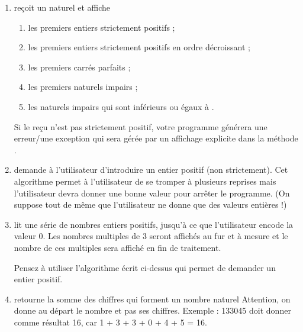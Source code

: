\documentclass[11pt,a4paper]{article}
\begin{document}
					\begin{enumerate}
				
			\item re\c coit un naturel \verb@n@ et affiche
              
					\begin{enumerate}
				
			\item les \verb@n@ premiers entiers strictement positifs ;
			\item les \verb@n@ premiers entiers strictement positifs en ordre d\'ecroissant ;
			\item les \verb@n@ premiers carr\'es parfaits ;
			\item les \verb@n@ premiers naturels impairs ;
			\item les naturels impairs qui sont inf\'erieurs ou \'egaux \`a \verb@n@.
					\end{enumerate}
				
              Si le \verb@n@ re\c cu n'est pas strictement positif, votre programme g\'en\'erera une erreur/une exception 
              qui sera g\'er\'ee par un affichage explicite dans la m\'ethode \verb@main@.
            
			\item 
              demande \`a l'utilisateur d'introduire un entier positif (non strictement). 
              Cet algorithme permet \`a l'utilisateur de se tromper \`a plusieurs reprises mais l'utilisateur devra donner
              une bonne valeur pour arr\^eter le programme.
              (On suppose tout de m\^eme que l'utilisateur ne donne que des valeurs enti\`eres !) 
            
			\item 
              lit une s\'erie de nombres entiers positifs, jusqu'\`a ce que l'utilisateur
              encode la valeur 0. Les nombres multiples de 3 seront affich\'es au fur et \`a mesure et le nombre
              de ces multiples sera affich\'e en fin de traitement.
              
            \par
        
              Pensez \`a utiliser l'algorithme \'ecrit ci-dessus qui permet de demander un entier positif.
              
            \par
        
			\item 
              retourne la somme des chiffres qui forment un nombre naturel \verb@n@
              Attention, on donne au d\'epart le nombre et pas ses chiffres. Exemple : 133045 doit donner
              comme r\'esultat 16, car 1 + 3 + 3 + 0 + 4 + 5 = 16.
            

\end{enumerate}
\end{document}
